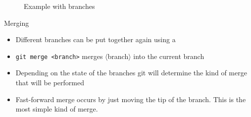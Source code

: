 \documentclass[12pt]{beamer}
\begin{document}
\begin{frame}
	\begin{figure}
     \caption{Example with branches}
\end{figure}
\end{frame}

\begin{frame}[fragile]{Merging}
\begin{itemize}
\item Different branches can be put together again using a \textbf{}
\item \texttt{git merge <branch>} merges $\langle$branch$\rangle$ into the current branch
\item Depending on the state of the branches git will determine the kind of merge that will be performed
\item Fast-forward merge occurs by just moving the tip of the branch. This is the most simple kind of merge.
\end{itemize}
\end{frame}
\end{document}
